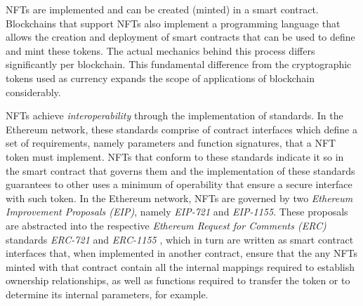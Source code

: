 \documentclass[../main.tex]{subfiles}
\begin{document}
\par
NFTs are implemented and can be created (minted) in a smart contract. Blockchains that support NFTs also implement a programming language that allows the creation and deployment of smart contracts that can be used to define and mint these tokens. The actual mechanics behind this process differs significantly per blockchain. This fundamental difference from the cryptographic tokens used as currency expands the scope of applications of blockchain considerably.
\par
NFTs achieve \textit{interoperability} through the implementation of standards. In the Ethereum network, these standards comprise of contract interfaces which define a set of requirements, namely parameters and function signatures, that a NFT token must implement. NFTs that conform to these standards indicate it so in the smart contract that governs them and the implementation of these standards guarantees to other uses a minimum of operability that ensure a secure interface with such token. In the Ethereum network, NFTs are governed by two \textit{Ethereum Improvement Proposals (EIP)}, namely \textit{EIP-721} and \textit{EIP-1155}. These proposals are abstracted into the respective \textit{Ethereum Request for Comments (ERC)} standards \textit{ERC-721} \cite{ERC721} and \textit{ERC-1155} \cite{ERC1155}, which in turn are written as smart contract interfaces that, when implemented in another contract, ensure that the any NFTs minted with that contract contain all the internal mappings required to establish ownership relationships, as well as functions required to transfer the token or to determine its internal parameters, for example.
\end{document}
